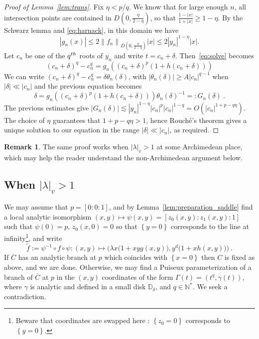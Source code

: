 \documentclass[11 pt, oneside, a4paper]{amsart}
\newcommand{\D}{\mathbb{D}}
\newcommand{\N}{\mathbb{N}}
\newcommand{\norm}[1]{\left\|#1\right\|}
\newcommand{\wt}{\widetilde}
\newcommand{\abs}[1]{{\left|{#1}\right|}}
\newcommand{\set}[1]{{\left\{#1\right\}}}
\newcommand{\lrpar}[1]{\left(#1\right)}
\theoremstyle{definition}
\newtheorem{rmk}[thm]{Remark}
\theoremstyle{definition}
\begin{document}
\begin{proof}[Proof of Lemma~\ref{lem:trans}]
 
Fix $\eta< p/q$. We know that for large enough $n$,  all intersection points 
are contained in {$D\lrpar{0, \frac{\eta}{2-\eta}}$}, so that 
$\frac{1-\abs{x}}{1+\abs{x}}\geq 1 - \eta$.  
By the Schwarz lemma and \eqref{eq:harnack}, in this domain we have  
\[\abs{g_n(x)} \leq 2 \norm{f_n}_{D\lrpar{0, \frac{\eta}{2-\eta}}} \abs{x} \leq 2\abs{y_n}^{1-\eta}\abs{x}.\]
Let $c_n$ be one of the $q^{\rm th}$ roots of $y_n$  and write $t = c_n+\delta$. 
Then~\eqref{eq:solve} becomes  
\begin{equation*} %
(c_n+\delta)^q - c_n^q = g_n( (c_n+\delta)^p(1+h(c_n+\delta)))
\end{equation*}
We can write $(c_n+\delta)^q - c_n^q= \delta \theta_n(\delta)$, with 
  $|\theta_n(\delta)|\ge A  |c_n|^{q-1}$ when $|\delta|\ll |c_n|$ and the previous equation becomes 
\[
\delta = g_n( (c_n+\delta)^p(1+h(c_n+\delta))) \theta_n(\delta)^{-1}=: G_n(\delta)~.
\]
The previous estimates give $|G_n(\delta)| \lesssim \abs{y_n}^{1-\eta} \abs{c_n}^p |c_n|^{1-q} = O( 
\abs{c_n}^{1+p - q\eta})$. The  choice of $\eta$ guarantees that 
$1+p-q\eta>1$, hence  Rouché's theorem gives a unique solution to our equation in the range $\abs{\delta}\ll\abs{c_n}$, 
 as required.
\end{proof}


\begin{rmk}
The same proof works   when $\abs{\lambda}_v>1$ at some Archime\-dean place, 
which may {help the reader} 
understand the non-Archimedean argument below.
\end{rmk}


\subsection{When $\abs{\lambda}_v >1$}
We may assume that $p=[0:0:1]$, and by Lemma~\ref{lem:preparation_saddle} 
find a local analytic isomorphism 
$(x,y) \mapsto \psi(x,y) = [z_0(x,y):z_1(x,y):1]$
such that $\psi(0) = p$, $z_0(x,0) = 0$ so that
$\set{y=0}$ corresponds to  the line at infinity\footnote{Beware that coordinates are swapped here
: $\set{z_0 = 0}$ corresponds to $\set{y=0}$.}, 
and write
\[
\wt{f}:=
\psi^{-1}\circ f \circ \psi: (x,y) \longmapsto   \Big(\lambda x \big(1+ xy g(x,y)\big) , y^d\big(1+ x h(x,y)\big)\Big)
~.
\]
If $\overline{C}$ has an analytic branch at $p$ which coincides with $\set{x=0}$
then  $C$ is fixed as above, and we are done. Otherwise, we may find 
a Puiseux parameterization of a branch of $\overline{C}$ at $p$ in the $(x,y)$ coordinates
of the form $\Gamma(t)= (t^q , \gamma(t))$, where $\gamma$ is analytic and 
defined in a small disk $\D_\delta$,   
and $q\in \N^*$. We seek a contradiction. 
\end{document}
